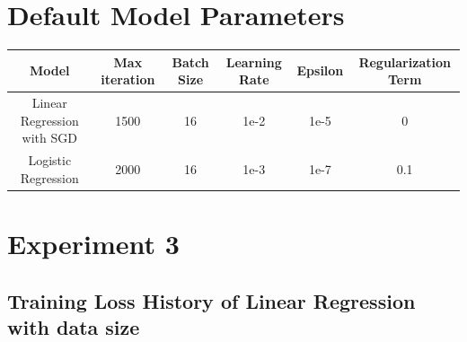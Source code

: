\documentclass{article}
\begin{document}
\begin{appendices}

\section{Default Model Parameters} \label{app:default-parameters}

\begin{table}[H]
    \centering
    \vspace{7pt} %
    \renewcommand{\arraystretch}{1.5}
    \begin{tabular}{|c|c|c|c|c|c|}
        \hline
        Model  & Max iteration & Batch Size & Learning Rate & Epsilon & Regularization Term \\
        \hline
        Linear Regression with SGD & 1500 & 16 & 1e-2 & 1e-5 & 0 \\
        Logistic Regression & 2000 & 16 & 1e-3 & 1e-7 & 0.1 \\
        \hline
    \end{tabular}
\end{table}

\section{Experiment 3}

\subsection{Training Loss History of Linear Regression with data size} \label{app:loss-history-sgd}


\end{appendices}
\end{document}
